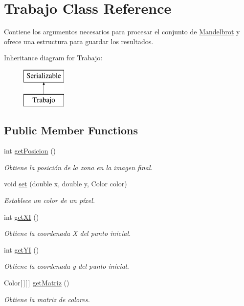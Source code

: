 \hypertarget{classTrabajo}{}\section{Trabajo Class Reference}
\label{classTrabajo}


Contiene los argumentos necesarios para procesar el conjunto de \hyperlink{classMandelbrot}{Mandelbrot} y ofrece una estructura para guardar los resultados.  


Inheritance diagram for Trabajo\+:\begin{figure}[H]
\begin{center}
\leavevmode
\includegraphics[height=2.000000cm]{classTrabajo}
\end{center}
\end{figure}
\subsection*{Public Member Functions}
\begin{DoxyCompactItemize}
\item 
int \hyperlink{classTrabajo_af9f14641f1998f17ae95631a8cc6859d}{get\+Posicion} ()
\begin{DoxyCompactList}\small\item\em Obtiene la posición de la zona en la imagen final. \end{DoxyCompactList}\item 
void \hyperlink{classTrabajo_ac32572a4925d6749fc46d18a056f1529}{set} (double x, double y, Color color)
\begin{DoxyCompactList}\small\item\em Establece un color de un píxel. \end{DoxyCompactList}\item 
int \hyperlink{classTrabajo_a0fe8005e31fc4e71e66fcf8cad67dc6a}{get\+XI} ()
\begin{DoxyCompactList}\small\item\em Obtiene la coordenada X del punto inicial. \end{DoxyCompactList}\item 
int \hyperlink{classTrabajo_a9b0bbf4c170c64b9e4af5444441f5487}{get\+YI} ()
\begin{DoxyCompactList}\small\item\em Obtiene la coordenada y del punto inicial. \end{DoxyCompactList}\item 
Color\mbox{[}$\,$\mbox{]}\mbox{[}$\,$\mbox{]} \hyperlink{classTrabajo_a5f807db0cb4016a3deffea7bb3b387c4}{get\+Matriz} ()
\begin{DoxyCompactList}\small\item\em Obtiene la matriz de colores. \end{DoxyCompactList}\end{DoxyCompactItemize}
